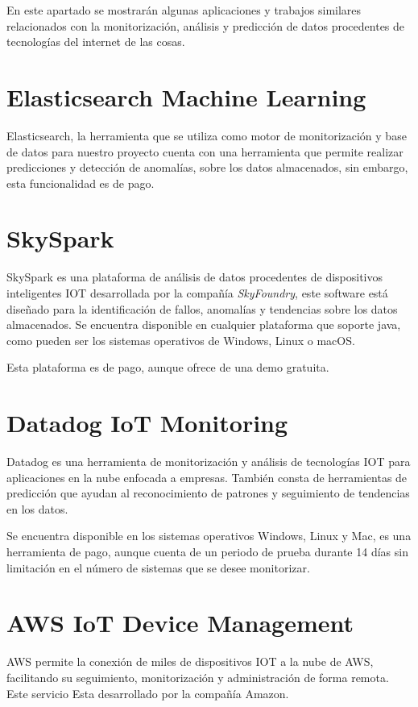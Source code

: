 

En este apartado se mostrarán algunas aplicaciones y trabajos similares relacionados con la monitorización, análisis y predicción de datos procedentes de tecnologías del internet de las cosas.


\section{Elasticsearch Machine Learning}

Elasticsearch, la herramienta que se utiliza como motor de monitorización y base de datos para nuestro proyecto cuenta con una herramienta que permite realizar predicciones y detección de anomalías, sobre los datos almacenados, sin embargo, esta funcionalidad es de pago.\cite{pagina:ElasticSearch}

\section{SkySpark}
SkySpark es una plataforma de análisis de datos procedentes de dispositivos inteligentes IOT desarrollada por la compañía \textit{SkyFoundry}, este software está diseñado para la identificación de fallos, anomalías y tendencias sobre los datos almacenados. Se encuentra disponible en cualquier plataforma que soporte java, como pueden ser los sistemas operativos de Windows, Linux o macOS. 

Esta plataforma es de pago, aunque ofrece de una demo gratuita. \cite{pagina:SkySpark} 


\section{Datadog IoT Monitoring}

Datadog es una herramienta de monitorización y análisis de tecnologías IOT para aplicaciones en la nube enfocada a empresas. También consta de herramientas de predicción que ayudan al reconocimiento de patrones y seguimiento de tendencias en los datos.

Se encuentra disponible en los sistemas operativos Windows, Linux y Mac, es una herramienta de pago, aunque cuenta de un periodo de prueba durante 14 días sin limitación en el número de sistemas que se desee monitorizar.\cite{pagina:DataDog}


\section{AWS IoT Device Management}

AWS permite la conexión de miles de dispositivos IOT a la nube de AWS, facilitando su seguimiento, monitorización y administración de forma remota. Este servicio Esta desarrollado por la compañía Amazon. \cite{pagina:AWS}
